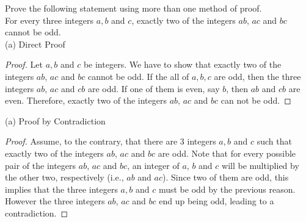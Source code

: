\documentclass[12pt]{article}
\newenvironment{problem}[2][Problem]{\begin{trivlist}
		\item[\hskip \labelsep {\bfseries #1}\hskip \labelsep {\bfseries #2.}]}{\end{trivlist}}
\begin{document}
	\begin{problem}{39}
		Prove the following statement using more than one method of proof.\\
		For every three integers $a,b$ and $c$, exactly two of the integers $ab$, $ac$ and $bc$ cannot be odd.\\
		
		(a) Direct Proof
		\begin{proof} 
			Let $a,b$ and $c$ be integers. We have to show that exactly two of the integers $ab$, $ac$ and $bc$ cannot be odd. If the all of $a,b,c$ are odd, then the three integers $ab$, $ac$ and $cb$ are odd. If one of them is even, say $b$, then $ab$ and $cb$ are even. Therefore, exactly two of the integers $ab$, $ac$ and $bc$ can not be odd.
		\end{proof}
	  
		(a) Proof by Contradiction
		\begin{proof}
			 Assume, to the contrary, that there are 3 integers $a,b$ and $c$ such that exactly two of the integers $ab$, $ac$ and $bc$ are odd. Note that for every possible pair of the integers $ab$, $ac$ and $bc$, an integer of $a$, $b$ and $c$ will be multiplied by the other two, respectively (i.e., $ab$ and $ac$). Since two of them are odd, this implies that the three integers $a,b$ and $c$ must be odd by the previous reason. However the three integers $ab$, $ac$ and $bc$ end up being odd, leading to a contradiction.
		\end{proof}
	\end{problem}
\end{document}
